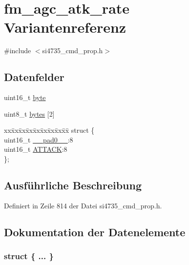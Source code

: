 \hypertarget{unionfm__agc__atk__rate}{}\section{fm\+\_\+agc\+\_\+atk\+\_\+rate Variantenreferenz}
\label{unionfm__agc__atk__rate}


{\ttfamily \#include $<$si4735\+\_\+cmd\+\_\+prop.\+h$>$}

\subsection*{Datenfelder}
\begin{DoxyCompactItemize}
\item 
uint16\+\_\+t \hyperlink{unionfm__agc__atk__rate_ab0549c1b5ea980a02e7eab77e21fea49}{byte}
\item 
uint8\+\_\+t \hyperlink{unionfm__agc__atk__rate_a46e4c05d20a047ec169f60d3167e912e}{bytes} \mbox{[}2\mbox{]}
\item 
\begin{tabbing}
xx\=xx\=xx\=xx\=xx\=xx\=xx\=xx\=xx\=\kill
struct \{\\
\>uint16\_t \hyperlink{unionfm__agc__atk__rate_a77132c2c26a75f5b8751b235cda23828}{\_\_pad0\_\_}:8\\
\>uint16\_t \hyperlink{unionfm__agc__atk__rate_a23a6aee9d921440c53996214126047a3}{ATTACK}:8\\
\}; \\

\end{tabbing}\end{DoxyCompactItemize}


\subsection{Ausführliche Beschreibung}


Definiert in Zeile 814 der Datei si4735\+\_\+cmd\+\_\+prop.\+h.



\subsection{Dokumentation der Datenelemente}
\hypertarget{unionfm__agc__atk__rate_acafd465f7e6af88a24f619734e02201d}{}\subsubsection[{"@99}]{\setlength{\rightskip}{0pt plus 5cm}struct \{ ... \} }\label{unionfm__agc__atk__rate_acafd465f7e6af88a24f619734e02201d}
\hypertarget{unionfm__agc__atk__rate_a77132c2c26a75f5b8751b235cda23828}{}
